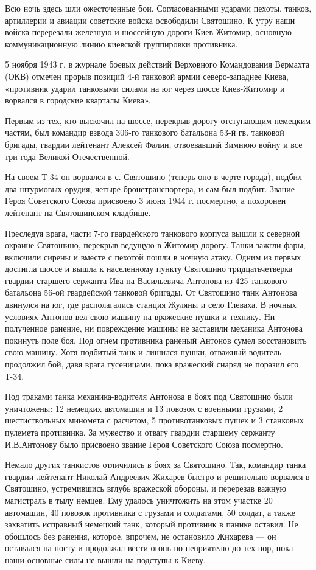 Всю ночь здесь шли ожесточенные бои. Согласованными ударами пехоты, танков,
артиллерии и авиации советские войска освободили Святошино. К утру наши войска
перерезали железную и шоссейную дороги Киев-Житомир, основную коммуникационную
линию киевской группировки противника.

5 ноября 1943 г. в журнале боевых действий Верховного Командования Вермахта
(ОКВ) отмечен прорыв позиций 4-й танковой армии северо-западнее Киева,
«противник ударил танковыми силами на юг через шоссе Киев-Житомир и ворвался в
городские кварталы Киева».

Первым из тех, кто выскочил на шоссе, перекрыв дорогу отступающим немецким
частям, был командир взвода 306-го танкового батальона 53-й гв. танковой
бригады, гвардии лейтенант Алексей Фалин, отвоевавший Зимнюю войну и все три
года Великой Отечественной.

На своем Т-34 он ворвался в с. Святошино (теперь оно в черте города), подбил
два штурмовых орудия, четыре бронетранспортера, и сам был подбит. Звание Героя
Советского Союза присвоено 3 июня 1944 г. посмертно, а похоронен лейтенант на
Святошинском кладбище.

Преследуя врага, части 7-го гвардейского танкового корпуса вышли к северной
окраине Святошино, перекрыв ведущую в Житомир дорогу. Танки зажгли фары,
включили сирены и вместе с пехотой пошли в ночную атаку. Одним из первых
достигла шоссе и вышла к населенному пункту Святошино тридцатьчетверка гвардии
старшего  сержанта Ива-на Васильевича Антонова из 425 танкового батальона 56-ой
гвардейской танковой бригады. От Святошино танк Антонова двинулся на юг, где
располагались станция Жуляны и село Глеваха. В ночных условиях Антонов вел свою
машину на вражеские пушки и технику. Ни полученное ранение, ни повреждение
машины не заставили механика Антонова покинуть поле боя. Под огнем противника
раненый Антонов сумел восстановить свою машину. Хотя подбитый танк и лишился
пушки, отважный водитель продолжил бой, давя врага гусеницами, пока вражеский
снаряд не поразил его Т-34.

Под траками танка механика-водителя Антонова в боях под Святошино были
уничтожены: 12 немецких автомашин и 13 повозок с военными грузами, 2
шестиствольных миномета с расчетом, 5 противотанковых пушек и 3 станковых
пулемета противника. За мужество и отвагу гвардии старшему сержанту
И.В.Антонову было присвоено звание Героя Советского Союза посмертно.

Немало других танкистов отличились в боях за Святошино. Так, командир танка
гвардии лейтенант Николай Андреевич Жихарев быстро и решительно ворвался в
Святошино, устремившись вглубь вражеской обороны, и перерезав важную магистраль
в тылу немцев. Ему удалось уничтожить на этом участке 20 автомашин, 40 повозок
противника с грузами и солдатами, 50 солдат, а также захватить исправный
немецкий танк, который противник в панике оставил. Не обошлось без ранения,
которое, впрочем, не остановило Жихарева — он оставался на посту и продолжал
вести огонь по неприятелю до тех пор, пока наши основные силы не вышли на
подступы к Киеву.

